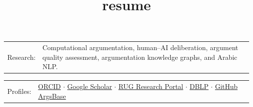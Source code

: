 \documentclass[10pt,a4paper]{article}
\title{resume}
\newcommand{\tzlarrow}{(0,0) -- (0.2,0) -- (0.3,0.2) -- (0.2,0.4) -- (0,0.4) -- (0.1,0.2) -- cycle;}
\newcommand{\larrow}[1]{
  \begin{tikzpicture}[scale=0.58]
    \filldraw[fill=#1!100,draw=#1!100!black]  \tzlarrow
  \end{tikzpicture}
}
\newcommand{\metasection}[2]{
  \begin{tabular*}{1\textwidth}{p{2.4cm} p{14cm}}
    \larrow{bgcol} \normalsize{\textcolor{bgcol}{#1}}&#2\\[10pt]
  \end{tabular*}
}
\begin{document}
\pagestyle{fancy}	


\vspace{-20pt}

\hspace{-0.25\linewidth}\colorbox{bgcol}{
}






\vspace{20pt}
\metasection{Research:}{Computational argumentation, human--AI deliberation, argument quality assessment, argumentation knowledge graphs, and Arabic NLP.}
\metasection{Profiles:}{\href{https://orcid.org/0009-0006-7255-5349}{ORCID} $\cdot$ \href{https://scholar.google.com/citations?user=mcOX6PYAAAAJ}{Google Scholar} $\cdot$ \href{https://research.rug.nl/en/persons/khalid-al-khatib/}{RUG Research Portal} $\cdot$ \href{https://dblp.org/pid/31/8936.html}{DBLP} $\cdot$ \href{https://github.com/Khalid-AlKhatib}{GitHub}
\href{https://argsbase.net}{ArgsBase}}
\end{document}
